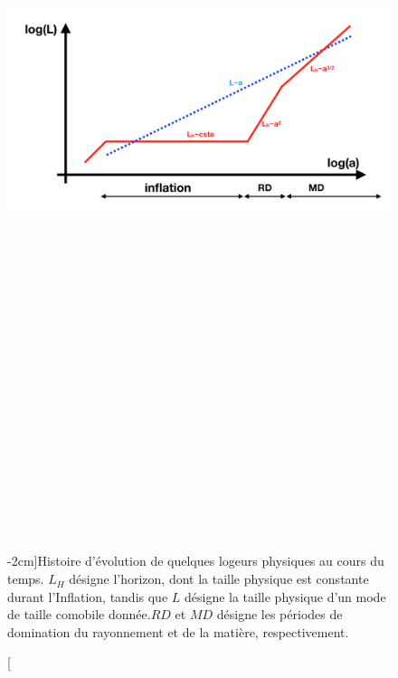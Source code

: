 \begin{figure}[htbp]
	\centering
		\includegraphics[height=25cm]{figs/inflation.png}
	\caption[Histoire d'évolution de quelques longueurs physiques au cours du temps.][-2cm]{Histoire d'évolution de quelques logeurs physiques au cours du temps. $L_H$ désigne l'horizon, dont la taille physique est constante durant l'Inflation, tandis que $L$ désigne la taille physique d'un mode de taille comobile donnée.$RD$ et $MD$ désigne les périodes de domination du rayonnement et de la matière, respectivement. }
	\label{f:inflation}
\end{figure}

